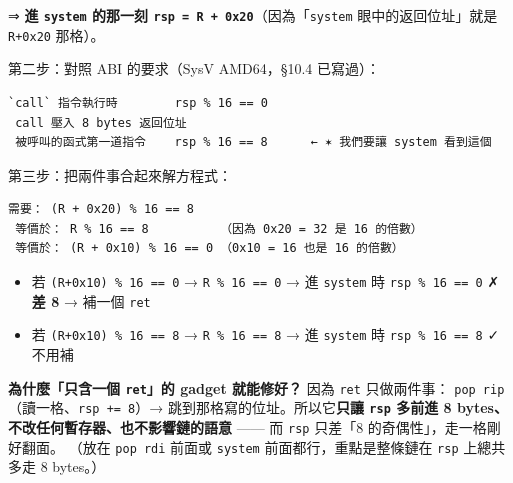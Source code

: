 \documentclass[10pt,a4paper]{article}
\providecommand{\tightlist}{%
  \setlength{\itemsep}{0pt}\setlength{\parskip}{0pt}}
\begin{document}
⇒ \textbf{進 \texttt{system} 的那一刻
\texttt{rsp\ \allowbreak{}=\ \allowbreak{}R\ \allowbreak{}+\ \allowbreak{}0x20}}（因為「\texttt{system} 眼中的返回位址」就是
\texttt{R+0x20} 那格）。

第二步：對照 ABI 的要求（SysV AMD64，§10.4 已寫過）：

\begin{Verbatim}[breaklines=true,breakanywhere=true,breakautoindent=false,fontsize=\fontsize{7.0}{9.5}\selectfont]
 `call` 指令執行時        rsp % 16 == 0
 call 壓入 8 bytes 返回位址
 被呼叫的函式第一道指令    rsp % 16 == 8      ← ✶ 我們要讓 system 看到這個
\end{Verbatim}

第三步：把兩件事合起來解方程式：

\begin{Verbatim}[breaklines=true,breakanywhere=true,breakautoindent=false,fontsize=\fontsize{7.0}{9.5}\selectfont]
 需要： (R + 0x20) % 16 == 8
 等價於： R % 16 == 8          （因為 0x20 = 32 是 16 的倍數）
 等價於： (R + 0x10) % 16 == 0 （0x10 = 16 也是 16 的倍數）
\end{Verbatim}

\begin{itemize}
\tightlist
\item
  若 \texttt{(R+0x10)\ \allowbreak{}\%\allowbreak{}\ \allowbreak{}16\ \allowbreak{}==\ \allowbreak{}0} → \texttt{R\ \allowbreak{}\%\allowbreak{}\ \allowbreak{}16\ \allowbreak{}==\ \allowbreak{}0} → 進
  \texttt{system} 時 \texttt{rsp\ \allowbreak{}\%\allowbreak{}\ \allowbreak{}16\ \allowbreak{}==\ \allowbreak{}0} ✗ \textbf{差 8} →
  補一個 \texttt{ret}
\item
  若 \texttt{(R+0x10)\ \allowbreak{}\%\allowbreak{}\ \allowbreak{}16\ \allowbreak{}==\ \allowbreak{}8} → \texttt{R\ \allowbreak{}\%\allowbreak{}\ \allowbreak{}16\ \allowbreak{}==\ \allowbreak{}8} → 進
  \texttt{system} 時 \texttt{rsp\ \allowbreak{}\%\allowbreak{}\ \allowbreak{}16\ \allowbreak{}==\ \allowbreak{}8} ✓ 不用補
\end{itemize}

\textbf{為什麼「只含一個 \texttt{ret}」的 gadget 就能修好？} 因為
\texttt{ret} 只做兩件事：
\texttt{pop\ \allowbreak{}rip}（讀一格、\texttt{rsp\ \allowbreak{}+=\ \allowbreak{}8}）→
跳到那格寫的位址。所以它\textbf{只讓 \texttt{rsp} 多前進 8 bytes、
不改任何暫存器、也不影響鏈的語意} ------ 而 \texttt{rsp} 只差「8
的奇偶性」，走一格剛好翻面。 （放在 \texttt{pop\ \allowbreak{}rdi} 前面或
\texttt{system} 前面都行，重點是整條鏈在 \texttt{rsp} 上總共多走 8
bytes。）
\end{document}
